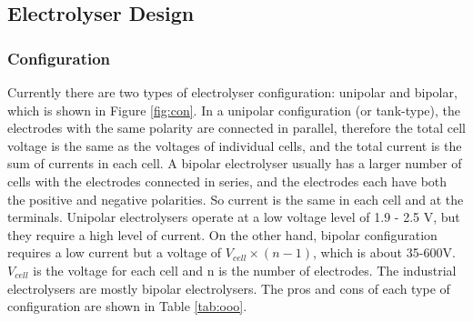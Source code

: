 \documentclass[11pt, a4paper]{article}
\begin{document}


\subsection{Electrolyser Design} 


\subsubsection{Configuration} 
Currently there are two types of electrolyser configuration: unipolar and bipolar, which is shown in Figure \ref{fig:con}. In a unipolar configuration (or tank-type), the electrodes with the same polarity are connected in parallel, therefore the total cell voltage is the same as the voltages of individual cells, and the total current is the sum of currents in each cell. A bipolar electrolyser usually has a larger number of cells with the electrodes connected in series, and the electrodes each have both the positive and negative polarities. So current is the same in each cell and at the terminals. Unipolar electrolysers operate at a low voltage level of 1.9 - 2.5 V,\cite{configuration} but they require a high level of current. On the other hand, bipolar configuration requires a low current but a voltage of $V_{cell} \times (n-1)$, which is about 35-600V.\cite{configuration} $V_{cell}$ is the voltage for each cell and n is the number of electrodes. The industrial electrolysers are mostly bipolar electrolysers.
The pros and cons of each type of configuration are shown in Table \ref{tab:ooo}.
\end{document}
